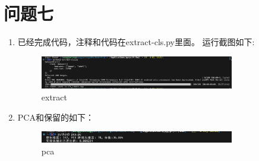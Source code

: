 \documentclass[answers]{exam}  %
\begin{document}
\section{问题七}
\begin{enumerate}[label=\alph*.] 
    \item 已经完成代码，注释和代码在extract-cls.py里面。
    运行截图如下:
    \begin{figure}[ht]
        \centering
        \label{extract}
        \includegraphics[width=0.8\textwidth]{extract.png} 
        \caption{extract}  
    \end{figure}
    \item PCA和保留的如下：
    \begin{figure}[ht]
        \centering
        \label{pca}
        \includegraphics[width=0.8\textwidth]{pca.png} 
        \caption{pca}  
    \end{figure}
\end{enumerate}
\end{document}
